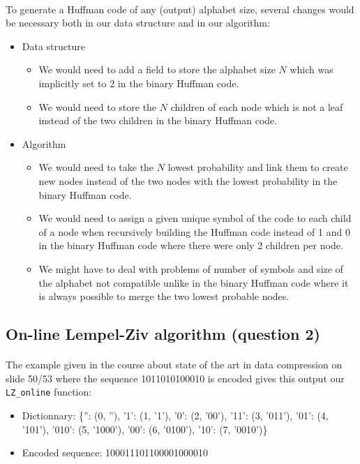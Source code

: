 \documentclass[a4paper, 11pt, oneside]{article}
\begin{document}
\paragraph{}To generate a Huffman code of any (output) alphabet size, several changes would be necessary both in our data structure and in our algorithm:
\begin{itemize}
    \item Data structure
        \begin{itemize}
            \item We would need to add a field to store the alphabet size $N$ which was implicitly set to 2 in the binary Huffman code.
            \item We would need to store the $N$ children of each node which is not a leaf instead of the two children in the binary Huffman code.
        \end{itemize}
    \item Algorithm
        \begin{itemize}
            \item We would need to take the $N$ lowest probability and link them to create new nodes instead of the two nodes with the lowest probability in the binary Huffman code.
            \item We would need to assign a given unique symbol of the code to each child of a node when recursively building the Huffman code instead of 1 and 0 in the binary Huffman code where there were only 2 children per node.
            \item We might have to deal with problems of number of symbols and size of the alphabet not compatible unlike in the binary Huffman code where it is always possible to merge the two lowest probable nodes. 
        \end{itemize}
\end{itemize}

\subsection{On-line Lempel-Ziv algorithm (question 2)}

\paragraph{}The example given in the course about state of the art in data compression on slide 50/53 where the sequence 1011010100010 is encoded gives this output our \texttt{LZ\_online} function:
\begin{itemize}
    \item Dictionnary: \{'': (0, ''), '1': (1, '1'), '0': (2, '00'), '11': (3, '011'), '01': (4, '101'), '010': (5, '1000'), '00': (6, '0100'), '10': (7, '0010')\}
    \item Encoded sequence: 100011101100001000010
\end{itemize}
\end{document}

